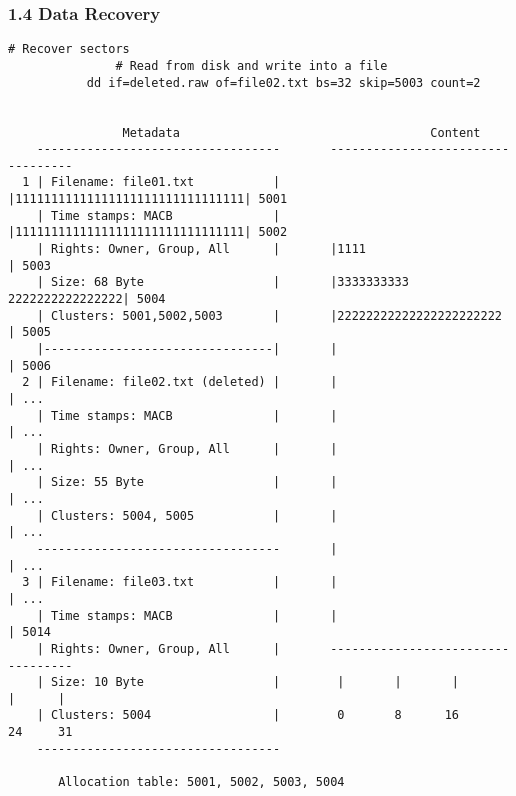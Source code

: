 \begin{frame}[fragile]
  \frametitle{1.4 Data Recovery}
  \begin{lstlisting}[basicstyle=\tiny\ttfamily]
               # Recover sectors
               # Read from disk and write into a file
	       dd if=deleted.raw of=file02.txt bs=32 skip=5003 count=2
                            

                Metadata                                   Content     
    ----------------------------------       ----------------------------------
  1 | Filename: file01.txt           |       |11111111111111111111111111111111| 5001
    | Time stamps: MACB              |       |11111111111111111111111111111111| 5002
    | Rights: Owner, Group, All      |       |1111                            | 5003
    | Size: 68 Byte                  |       |3333333333      2222222222222222| 5004
    | Clusters: 5001,5002,5003       |       |22222222222222222222222         | 5005
    |--------------------------------|       |                                | 5006
  2 | Filename: file02.txt (deleted) |       |                                | ...
    | Time stamps: MACB              |       |                                | ...
    | Rights: Owner, Group, All      |       |                                | ...
    | Size: 55 Byte                  |       |                                | ...
    | Clusters: 5004, 5005           |       |                                | ...
    ----------------------------------       |                                | ...
  3 | Filename: file03.txt           |       |                                | ...
    | Time stamps: MACB              |       |                                | 5014
    | Rights: Owner, Group, All      |       ----------------------------------
    | Size: 10 Byte                  |        |       |       |       |      |
    | Clusters: 5004                 |        0       8      16      24     31
    ----------------------------------

       Allocation table: 5001, 5002, 5003, 5004
  \end{lstlisting}
\end{frame}


